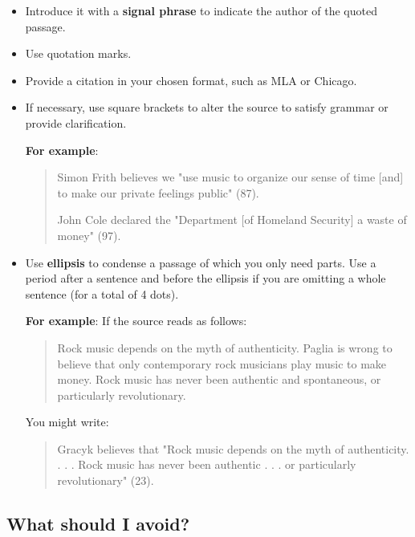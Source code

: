  \begin{itemize}       	
\item Introduce it with a \textbf{signal phrase} to indicate the author of the quoted
passage.

\item Use quotation marks.

\item Provide a citation in your chosen format, such as MLA or Chicago.
        	
\item If necessary, use square brackets to alter the source to satisfy grammar or provide
clarification.

\textbf{For example}:

\begin{quote} Simon Frith believes we "use music to organize our sense of time [and] 
to make our private feelings public" (87). 

\medskip

John Cole declared the "Department [of Homeland Security] a waste of money" (97).
\end{quote}

\item Use \textbf{ellipsis} to condense a passage of which you only need parts. Use a period 
after a sentence and before the ellipsis if you are omitting a whole sentence (for a 
total of 4 dots).

\textbf{For example}:
 If the source reads as follows:
\begin{quote}
Rock music depends on the myth of authenticity. Paglia is wrong to believe that only 
contemporary rock musicians play music to make money. Rock music has never been 
authentic and spontaneous, or particularly revolutionary.
\end{quote}
         
You might write:
\begin{quote}
Gracyk believes that "Rock music depends on the myth of authenticity. . . . Rock 
music has never been authentic . . . or particularly revolutionary" (23).
 \end{quote}
 \end{itemize}
 
\subsection{What should I avoid?}

